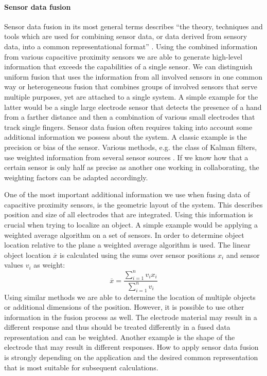 \paragraph{Sensor data fusion}
Sensor data fusion in its most general terms describes “the theory, techniques and tools which are used for combining sensor data, or data derived from sensory data, into a common representational format” \cite{mitchell2007introduction}. Using the combined information from various capacitive proximity sensors we are able to generate high-level information that exceeds the capabilities of a single sensor. We can distinguish uniform fusion that uses the information from all involved sensors in one common way or heterogeneous fusion that combines groups of involved sensors that serve multiple purposes, yet are attached to a single system. A simple example for the latter would be a single large electrode sensor that detects the presence of a hand from a farther distance and then a combination of various small electrodes that track single fingers. 
Sensor data fusion often requires taking into account some additional information we possess about the system. A classic example is the precision or bias of the sensor. Various methods, e.g. the class of Kalman filters, use weighted information from several sensor sources \cite{welch1995introduction}. If we know how that a certain sensor is only half as precise as another one working in collaborating, the weighting factors can be adapted accordingly. 

One of the most important additional information we use when fusing data of capacitive proximity sensors, is the geometric layout of the system. This describes position and size of all electrodes that are integrated. Using this information is crucial when trying to localize an object. A simple example would be applying a weighted average algorithm on a set of sensors. In order to determine object location relative to the plane a weighted average algorithm is used. The linear object location $\overline{x}$ is calculated using the sums over sensor positions $x_i$ and sensor values $v_i$ as weight:
\begin{equation}
\overline{x}=\frac{\sum^n_{i=1}{v_i x_i}}{\sum^n_{i=1}{v_i}}
\end{equation}
Using similar methods we are able to determine the location of multiple objects or additional dimensions of the position.
However, it is possible to use other information in the fusion process as well. The electrode material may result in a different response and thus should be treated differently in a fused data representation and can be weighted. Another example is the shape of the electrode that may result in different responses. How to apply sensor data fusion is strongly depending on the application and the desired common representation that is most suitable for subsequent calculations.


